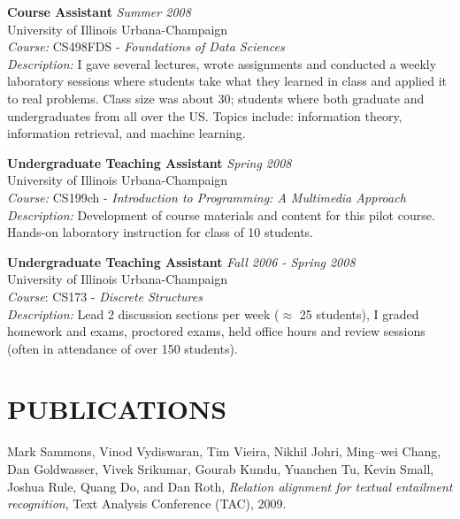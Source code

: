 \documentclass{report}
\begin{document}
{\bf Course Assistant} \hfill {\it Summer 2008} \\
University of Illinois Urbana-Champaign \\
{\sl Course:} CS498FDS - {\sl Foundations of Data Sciences} \\
{\sl Description:} I gave several lectures, wrote assignments and conducted a weekly laboratory sessions where students take what they learned in class and applied it to real problems. Class size was about 30; students where both graduate and undergraduates from all over the US. Topics include: information theory, information retrieval, and machine learning.
				
{\bf Undergraduate Teaching Assistant} \hfill {\it Spring 2008} \\
University of Illinois Urbana-Champaign \\
{\sl Course:} CS199ch - {\sl Introduction to Programming: A Multimedia             Approach} \\
{\sl Description:} Development of course materials and content for this         pilot course. Hands-on laboratory instruction for class of 10 students.

{\bf Undergraduate Teaching Assistant} \hfill {\it Fall 2006 - Spring 2008} \\
University of Illinois Urbana-Champaign \\
{\sl Course}: CS173 - {\sl Discrete Structures} \\
{\sl Description:} Lead 2 discussion sections per week ($\approx$ 25 students), I graded homework and exams, proctored exams, held office hours and review sessions (often in attendance of over 150 students).



\section*{PUBLICATIONS} 

%
%

Mark Sammons, Vinod Vydiswaran, Tim Vieira, Nikhil Johri, Ming--wei Chang,
Dan Goldwasser, Vivek Srikumar, Gourab Kundu, Yuanchen Tu, Kevin Small,
Joshua Rule, Quang Do, and Dan Roth, \emph{Relation alignment for textual entailment recognition}, Text Analysis Conference (TAC), 2009.
\end{document}

